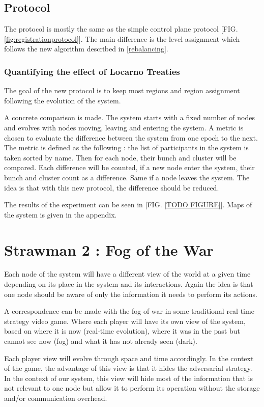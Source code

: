 \documentclass[a4paper,11pt,oneside]{report}
\begin{document}
\subsection{Protocol}
The protocol is mostly the same as the simple control plane protocol [FIG.
\ref{fig:registrationprotocol}]. The main difference is the level assignment
which follows the new algorithm described in \ref{rebalancing}. 

\subsubsection{Quantifying the effect of Locarno Treaties}
The goal of the new protocol is to keep most regions and region assignment
following the evolution of the system. 

A concrete comparison is made. The system starts with a fixed number of nodes
and evolves with nodes moving, leaving and entering the system. A metric is
chosen to evaluate the difference between the system from one epoch to the
next. The metric is defined as the following :  the list of participants in the
system is taken sorted by name. Then for each node, their bunch and cluster
will be compared. Each difference will be counted, if a new node enter the
system, their bunch and cluster count as a difference. Same if a node leaves
the system. The idea is that with this new protocol, the difference should be
reduced. 

The results of the experiment can be seen in [FIG. \ref{TODO FIGURE}]. Maps of
the system is given in the appendix.

\section{Strawman 2 : Fog of the War}

Each node of the system will have a different view of the world at a given time
depending on its place in the system and its interactions. Again the idea is
that one node should be aware of only the information it needs to perform its
actions. 

A correspondence can be made with the fog of war in some traditional real-time
strategy video game. Where each player will have its own view of the system,
based on where it is now (real-time evolution), where it was in the past but
cannot see now (fog) and what it has not already seen (dark).

Each player view will evolve through space and time accordingly. In the context
of the game, the advantage of this view is that it hides the adversarial
strategy. In the context of our system, this view will hide most of the
information that is not relevant to one node but allow it to perform its
operation without the storage and/or communication overhead. 
\end{document}
